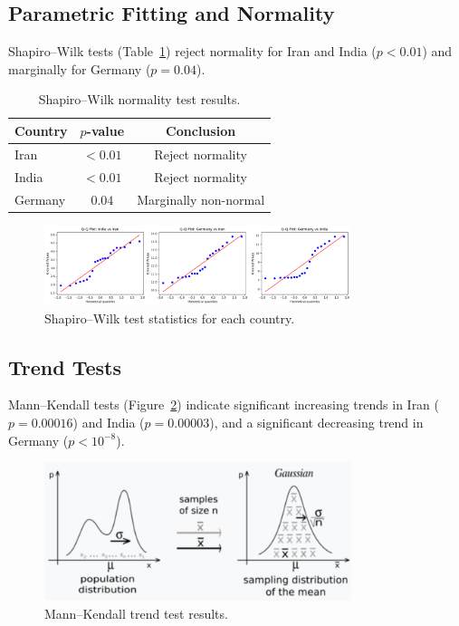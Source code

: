 \documentclass[12pt,a4paper]{article}
\begin{document}
	\subsection{Parametric Fitting and Normality}
	Shapiro--Wilk tests (Table~\ref{tab:sw}) reject normality for Iran and India ($p<0.01$) and marginally for Germany ($p=0.04$).
	
	\begin{table}[ht]
		\centering
		\caption{Shapiro--Wilk normality test results.}
		\label{tab:sw}
		\begin{tabular}{lcc}
			\toprule
			Country & $p$-value & Conclusion \\
			\midrule
			Iran    & $<0.01$  & Reject normality \\
			India   & $<0.01$  & Reject normality \\
			Germany & $0.04$   & Marginally non-normal \\
			\bottomrule
		\end{tabular}
	\end{table}
	
	\begin{figure}[ht]
		\centering
		\includegraphics[width=0.8\textwidth]{figure-5.png}
		\caption{Shapiro--Wilk test statistics for each country.}
		\label{fig:sw}
	\end{figure}
	
	\subsection{Trend Tests}
	Mann--Kendall tests (Figure~\ref{fig:mk}) indicate significant increasing trends in Iran ($p=0.00016$) and India ($p=0.00003$), and a significant decreasing trend in Germany ($p<10^{-8}$).
	
	\begin{figure}[ht]
		\centering
		\includegraphics[width=0.8\textwidth]{figure-6.png}
		\caption{Mann--Kendall trend test results.}
		\label{fig:mk}
	\end{figure}
	
\end{document}
